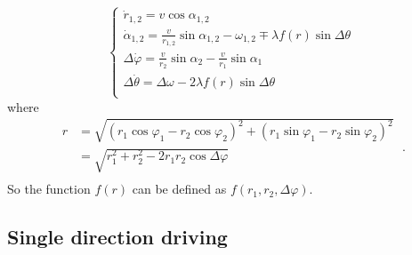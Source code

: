\documentclass{article}
\begin{document}
\begin{equation}\label{eq:l1.2}
    \begin{cases}
        \dot{r}_{1,2}=v\cos \alpha _{1,2}\\
        \dot{\alpha}_{1,2}=\frac{v}{r_{1,2}}\sin \alpha _{1,2}-\omega _{1,2}\mp \lambda f\left( r \right) \sin \Delta \theta\\
        \Delta \dot{\varphi}=\frac{v}{r_2}\sin \alpha _2-\frac{v}{r_1}\sin \alpha _1\\
        \Delta \dot{\theta}=\Delta \omega -2\lambda f\left( r \right) \sin \Delta \theta\\
    \end{cases}
\end{equation}
where
$$
\begin{aligned}
	r&=\sqrt{\left( r_1\cos \varphi _1-r_2\cos \varphi _2 \right) ^2+\left( r_1\sin \varphi _1-r_2\sin \varphi _2 \right) ^2}\\
	&=\sqrt{r_{1}^{2}+r_{2}^{2}-2r_1r_2\cos \Delta \varphi}\\
\end{aligned}\;.
$$
So the function $f\left( r \right)$ can be defined as $f\left( r_1,r_2,\Delta \varphi \right)$.

\subsection{Single direction driving}
\end{document}
